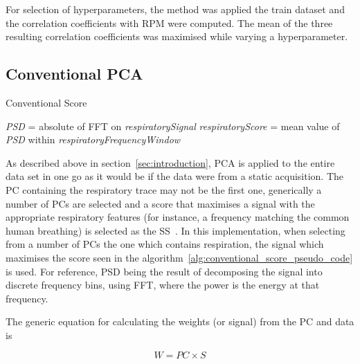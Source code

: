         For selection of hyperparameters, the method was applied the train dataset and the correlation coefficients with \gls{RPM} were computed. The mean of the three resulting correlation coefficients was maximised while varying a hyperparameter.
        
    \subsection{Conventional PCA} \label{sec:conventional_pca}
        \begin{algorithm} \label{alg:conventional_score_pseudo_code}
            \caption{Conventional Score}
            \;
            \;
            \textit{PSD} = absolute of \gls{FFT} on \textit{respiratorySignal}\;
            \;
            \textit{respiratoryScore} = mean value of \textit{PSD}  within \textit{respiratoryFrequencyWindow}\;
            \;
        \end{algorithm}
        
        As described above in section~\ref{sec:introduction}, \gls{PCA} is applied to the entire data set in one go as it would be if the data were from a static acquisition. The \gls{PC} containing the respiratory trace may not be the first one, generically a number of \glspl{PC} are selected and a score that maximises a signal with the appropriate respiratory features (for instance, a frequency matching the common human breathing) is selected as the \gls{SS}~\parencite{Bertolli2017}. In this implementation, when selecting from a number of \glspl{PC} the one which contains respiration, the signal which maximises the score seen in the algorithm~\ref{alg:conventional_score_pseudo_code} is used. For reference, \gls{PSD} being the result of decomposing the signal into discrete frequency bins, using \gls{FFT}, where the power is the energy at that frequency.
        
        The generic equation for calculating the weights (or signal) from the \gls{PC} and data is
            
        \begin{equation} \label{eq:pc_weights}
            W = PC \times S
        \end{equation}
            
